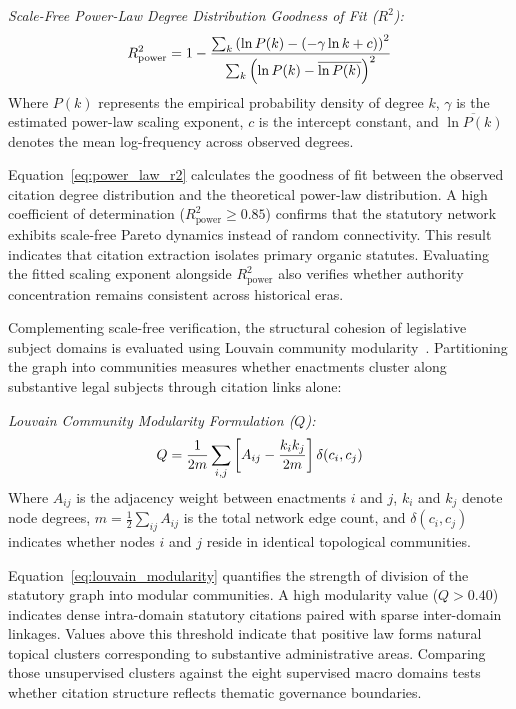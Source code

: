     \noindent\textit{Scale-Free Power-Law Degree Distribution Goodness of Fit ($R^2$):}
    \begin{equation}
        R_{\text{power}}^2 = 1 - \frac{\sum_{k} \left(\ln P(k) - (-\gamma \ln k + c)\right)^2}{\sum_{k} \left(\ln P(k) - \overline{\ln P(k)}\right)^2}
        \label{eq:power_law_r2}
        \eqcaption{Scale-Free Power-Law Degree Distribution Goodness of Fit ($R^2$)}
    \end{equation}
    \noindent Where $P(k)$ represents the empirical probability density of degree $k$, $\gamma$ is the estimated power-law scaling exponent, $c$ is the intercept constant, and $\overline{\ln P(k)}$ denotes the mean log-frequency across observed degrees.

    Equation~\ref{eq:power_law_r2} calculates the goodness of fit between the observed citation degree distribution and the theoretical power-law distribution. A high coefficient of determination ($R_{\text{power}}^2 \ge 0.85$) confirms that the statutory network exhibits scale-free Pareto dynamics instead of random connectivity. This result indicates that citation extraction isolates primary organic statutes. Evaluating the fitted scaling exponent alongside $R_{\text{power}}^2$ also verifies whether authority concentration remains consistent across historical eras.

    Complementing scale-free verification, the structural cohesion of legislative subject domains is evaluated using Louvain community modularity~\cite{blondel2008fast}. Partitioning the graph into communities measures whether enactments cluster along substantive legal subjects through citation links alone:

    \noindent\textit{Louvain Community Modularity Formulation ($Q$):}
    \begin{equation}
        Q = \frac{1}{2m} \sum_{i, j} \left[ A_{ij} - \frac{k_i k_j}{2m} \right] \delta(c_i, c_j)
        \label{eq:louvain_modularity}
        \eqcaption{Louvain Community Modularity Formulation ($Q$)}
    \end{equation}
    \noindent Where $A_{ij}$ is the adjacency weight between enactments $i$ and $j$, $k_i$ and $k_j$ denote node degrees, $m = \frac{1}{2}\sum_{ij} A_{ij}$ is the total network edge count, and $\delta(c_i, c_j)$ indicates whether nodes $i$ and $j$ reside in identical topological communities.

    Equation~\ref{eq:louvain_modularity} quantifies the strength of division of the statutory graph into modular communities. A high modularity value ($Q > 0.40$) indicates dense intra-domain statutory citations paired with sparse inter-domain linkages. Values above this threshold indicate that positive law forms natural topical clusters corresponding to substantive administrative areas. Comparing those unsupervised clusters against the eight supervised macro domains tests whether citation structure reflects thematic governance boundaries.


